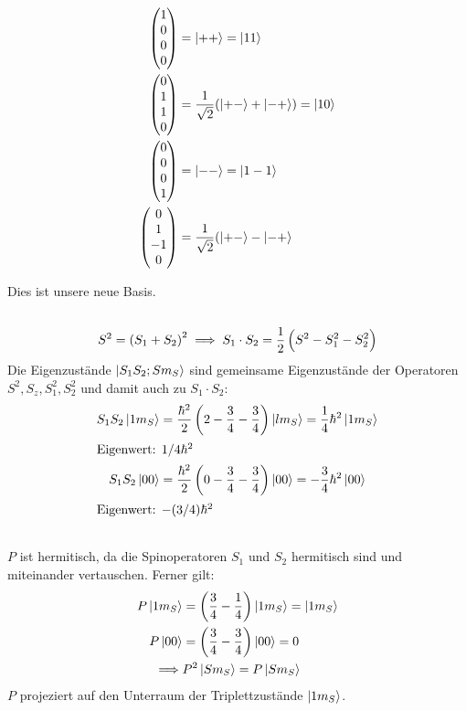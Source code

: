 \begin{align*}
\begin{pmatrix} 1 \\ 0 \\ 0 \\ 0 \end{pmatrix} &= \left|++\right\rangle = \left|11\right\rangle \\
\begin{pmatrix} 0 \\ 1 \\ 1 \\ 0 \end{pmatrix} &= \frac{1}{\sqrt 2}(\left|+-\right\rangle+\left|-+\right\rangle) = \left|10\right\rangle \\
\begin{pmatrix} 0 \\ 0 \\ 0 \\ 1 \end{pmatrix} &= \left|--\right\rangle = \left|1-1\right\rangle \\
\begin{pmatrix} 0 \\ 1 \\ -1 \\ 0 \end{pmatrix} &=\frac 1{\sqrt 2}(\left|+-\right\rangle-\left|-+\right\rangle \\
\end{align*}

Dies ist unsere neue Basis.

\subsection{}
\begin{align*}
 S^2 = \del{S_1 + S_2}^2 \implies S_1\cdot S_2 = \frac12\del{S^2 - S_1^2 - S_2^2}
\end{align*}
Die Eigenzustände $\left|S_1 S_2; S m_S\right\rangle$ sind gemeinsame Eigenzustände der Operatoren $S^2, S_z, S_1^2, S_2^2$ und damit auch zu $S_1\cdot S_2$:
\begin{align*}
 S_1S_2\ket{1m_S} &= \frac{\hbar^2}2 \del{2 - \frac34 - \frac34}\ket{lm_S} = \frac14\hbar^2\ket{1m_S}\\
 \intertext{%
  Eigenwert: $1/4 \hbar^2$}
 S_1S_2\ket{00} &= \frac{\hbar^2}2 \del{0 - \frac34 - \frac34}\ket{00} = -\frac34\hbar^2\ket{00}\\
 \intertext{%
  Eigenwert: $-(3/4)\hbar^2$}
\end{align*}

\subsection{}
$P$ ist hermitisch, da die Spinoperatoren $S_1$ und $S_2$ hermitisch sind und miteinander vertauschen. Ferner gilt:
\begin{align*}
 P\ket{1m_S} &= \del{\frac34 - \frac14} \ket{1m_S} = \ket{1m_S}\\
 P\ket{00} &= \del{\frac34 - \frac34}\ket{00} = 0\\
 \implies &P^2\ket{Sm_S} = P\ket{Sm_S}
\end{align*}
$P$ projeziert auf den Unterraum der Triplettzustände $\left|1m_S\right\rangle$.

